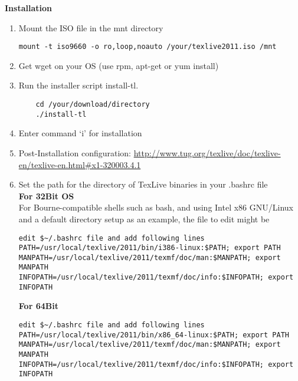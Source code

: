 \documentclass[a4paper,twoside,12pt,fleqn,openright]{article}
\begin{document}
\textbf{Installation}\\
\begin{enumerate}
\item	Mount the ISO file in the mnt directory\\

\begin{verbatim}mount -t iso9660 -o ro,loop,noauto /your/texlive2011.iso /mnt\end{verbatim}

\item	Get wget on your OS (use rpm, apt-get or yum install)
\item	Run the installer script install-tl.
\begin{verbatim}
	cd /your/download/directory
	./install-tl
\end{verbatim}
\item	Enter command `i' for installation

\item	Post-Installation configuration: \href{http://www.tug.org/texlive/doc/texlive-en/texlive-en.html\#x1-320003.4.1}{http://www.tug.org/texlive/doc/texlive-en/texlive-en.html\#x1-320003.4.1} 
\item	Set the path for the directory of TexLive binaries in your .bashrc file\\
\textbf{For 32Bit OS}\\
For Bourne-compatible shells such as bash, and using Intel x86 GNU/Linux and a default directory setup as an example, the file to edit might be \begin{verbatim}
edit $~/.bashrc file and add following lines
PATH=/usr/local/texlive/2011/bin/i386-linux:$PATH; export PATH 
MANPATH=/usr/local/texlive/2011/texmf/doc/man:$MANPATH; export MANPATH 
INFOPATH=/usr/local/texlive/2011/texmf/doc/info:$INFOPATH; export INFOPATH
\end{verbatim}
\textbf{For 64Bit}\\
\begin{verbatim}
edit $~/.bashrc file and add following lines
PATH=/usr/local/texlive/2011/bin/x86_64-linux:$PATH; export PATH 
MANPATH=/usr/local/texlive/2011/texmf/doc/man:$MANPATH; export MANPATH 
INFOPATH=/usr/local/texlive/2011/texmf/doc/info:$INFOPATH; export INFOPATH

\end{verbatim}

\end{enumerate}
\end{document}
